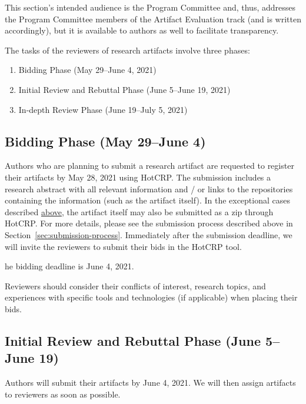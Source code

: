 \documentclass[twoside,a4paper]{refart}
\newcommand{\deadline}[1]{\attention[\faCalendar]{#1}}
\begin{document}
This section's intended audience is the Program Committee and, thus,
addresses the Program Committee members of the Artifact Evaluation
track (and is written accordingly), but it is available to authors as
well to facilitate transparency.

The tasks of the reviewers of research artifacts involve three phases:
\begin{enumerate}
  \item Bidding Phase (May 29--June 4, 2021)
  \item Initial Review and Rebuttal Phase (June 5--June 19, 2021) 
  \item In-depth Review Phase (June 19--July 5, 2021)
\end{enumerate}

\subsection{Bidding Phase (May 29--June 4)}

Authors who are planning to submit a research artifact are requested
to register their artifacts by May 28, 2021 using HotCRP. The
submission includes a research abstract with all relevant information
and / or links to the repositories containing the information (such as
the artifact itself). In the exceptional cases described
\hyperlink{notavailable}{above}, the artifact itself may also be
submitted as a zip through HotCRP. For more details, please see the
submission process described above in
Section~\ref{sec:submission-process}. Immediately after the submission
deadline, we will invite the reviewers to submit their bids in the
HotCRP tool.

\deadline The bidding deadline is June 4, 2021.

Reviewers should consider their conflicts of interest, research
topics, and experiences with specific tools and technologies (if
applicable) when placing their bids.

\subsection{Initial Review and Rebuttal Phase (June 5--June 19)}

Authors will submit their artifacts by June 4, 2021. We will then
assign artifacts to reviewers as soon as possible.
\end{document}
